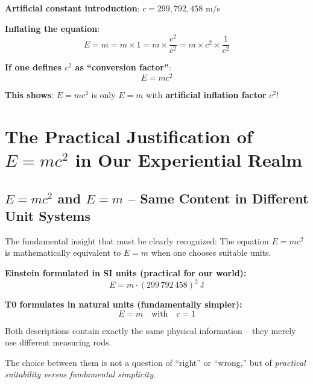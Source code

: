 	\textbf{Artificial constant introduction}: $c = 299,792,458$ m/s
	
	\textbf{Inflating the equation}:
	\begin{equation}
		E = m = m \times 1 = m \times \frac{c^2}{c^2} = m \times c^2 \times \frac{1}{c^2}
	\end{equation}
	
	\textbf{If one defines $c^2$ as ``conversion factor''}:
	\begin{equation}
		E = mc^2
	\end{equation}
	
	\textbf{This shows}: $E = mc^2$ is only $E = m$ with \textbf{artificial inflation factor} $c^2$!
	
	\section{The Practical Justification of \( E = mc^2 \) in Our Experiential Realm}
	
	\subsection{\( E = mc^2 \) and \( E = m \) – Same Content in Different Unit Systems}
	
	\begin{tcolorbox}[colback=blue!10!white,colframe=blue!75!black,title=The Pragmatic Perspective: Unit Systems and Conventions]
		The fundamental insight that must be clearly recognized: The equation \( E = mc^2 \) is mathematically equivalent to \( E = m \) when one chooses suitable units.
		
		\textbf{Einstein formulated in SI units (practical for our world):}
		\begin{equation}
			E = m \cdot (299\,792\,458)^2 \ \text{J} 
		\end{equation}
		
		\textbf{T0 formulates in natural units (fundamentally simpler):}
		\begin{equation}
			E = m \quad \text{with} \quad c = 1
		\end{equation}
		
		Both descriptions contain exactly the same physical information – they merely use different measuring rods.
		
		The choice between them is not a question of ``right'' or ``wrong,'' but of \textit{practical suitability versus fundamental simplicity}.
	\end{tcolorbox}
	
